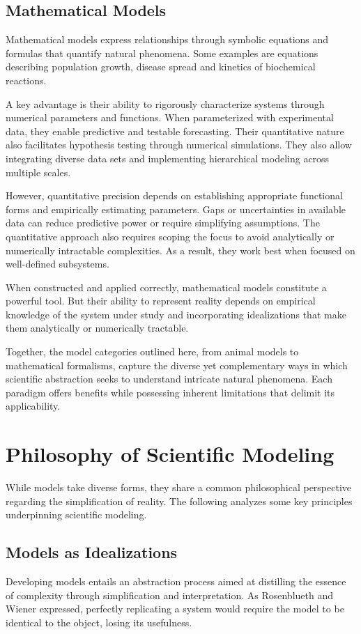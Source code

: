 \subsection{Mathematical Models}
Mathematical models express relationships through symbolic equations and formulas that quantify natural phenomena. Some examples are equations describing population growth, disease spread and kinetics of biochemical reactions.

A key advantage is their ability to rigorously characterize systems through numerical parameters and functions. When parameterized with experimental data, they enable predictive and testable forecasting. Their quantitative nature also facilitates hypothesis testing through numerical simulations. They also allow integrating diverse data sets and implementing hierarchical modeling across multiple scales.

However, quantitative precision depends on establishing appropriate functional forms and empirically estimating parameters. Gaps or uncertainties in available data can reduce predictive power or require simplifying assumptions. The quantitative approach also requires scoping the focus to avoid analytically or numerically intractable complexities. As a result, they work best when focused on well-defined subsystems.

When constructed and applied correctly, mathematical models constitute a powerful tool. But their ability to represent reality depends on empirical knowledge of the system under study and incorporating idealizations that make them analytically or numerically tractable.

Together, the model categories outlined here, from animal models to mathematical formalisms, capture the diverse yet complementary ways in which scientific abstraction seeks to understand intricate natural phenomena. Each paradigm offers benefits while possessing inherent limitations that delimit its applicability.

\section{Philosophy of Scientific Modeling}
While models take diverse forms, they share a common philosophical perspective regarding the simplification of reality. The following analyzes some key principles underpinning scientific modeling.

\subsection{Models as Idealizations}
Developing models entails an abstraction process aimed at distilling the essence of complexity through simplification and interpretation. As Rosenblueth and Wiener expressed, perfectly replicating a system would require the model to be identical to the object, losing its usefulness.

